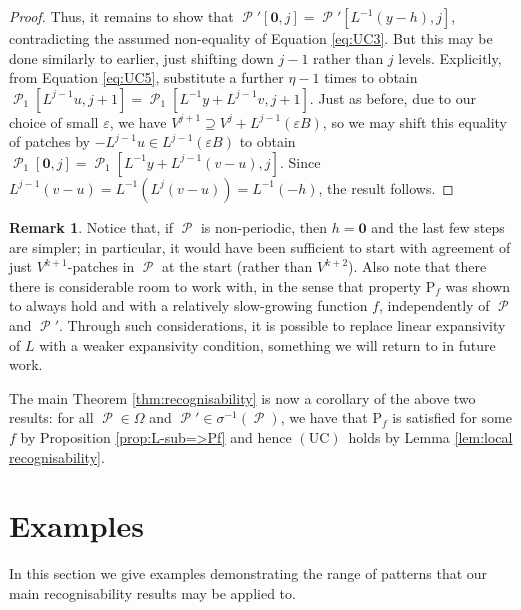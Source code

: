 \documentclass[11pt]{amsart}
\numberwithin{equation}{section}
\theoremstyle{plain}
\theoremstyle{definition}
\newtheorem{remark}[theorem]{Remark}
\renewcommand{\epsilon}{\varepsilon}
\newcommand{\sub}{\sigma}
\DeclareMathOperator{\cP}{\mathcal{P}}
\newcommand{\UC}{\(\mathrm{(UC)}\)}
\begin{document}
\begin{proof}
Thus, it remains to show that \(\cP'[\mathbf{0},j] = \cP'[L^{-1}(y-h),j]\), contradicting the assumed non-equality of Equation \ref{eq:UC3}. But this may be done similarly to earlier, just shifting down \(j-1\) rather than \(j\) levels. Explicitly, from Equation \ref{eq:UC5}, substitute a further \(\eta-1\) times to obtain \(\cP_1[L^{j-1} u,j+1] = \cP_1[L^{-1} y + L^{j-1} v,j+1]\). Just as before, due to our choice of small \(\epsilon\), we have \(V^{j+1} \supseteq V^j + L^{j-1}(\epsilon B)\), so we may shift this equality of patches by \(-L^{j-1} u \in L^{j-1}(\epsilon B)\) to obtain \(\cP_1[\mathbf{0},j] = \cP_1[L^{-1} y + L^{j-1}(v-u),j]\). Since \(L^{j-1}(v-u) = L^{-1}(L^j(v-u)) = L^{-1}(-h)\), the result follows.
\end{proof}

\begin{remark}
Notice that, if \(\cP\) is non-periodic, then \(h=\mathbf{0}\) and the last few steps are simpler; in particular, it would have been sufficient to start with agreement of just \(V^{k+1}\)-patches in \(\cP\) at the start (rather than \(V^{k+2}\)). Also note that there there is considerable room to work with, in the sense that property \(\mathrm{P}_f\) was shown to always hold and with a relatively slow-growing function \(f\), independently of \(\cP\) and \(\cP'\). Through such considerations, it is possible to replace linear expansivity of \(L\) with a weaker expansivity condition, something we will return to in future work.
\end{remark}

The main Theorem \ref{thm:recognisability} is now a corollary of the above two results: for all \(\cP \in \Omega\) and \(\cP' \in \sub^{-1}(\cP)\), we have that \(\mathrm{P}_f\) is satisfied for some \(f\) by Proposition \ref{prop:L-sub=>Pf} and hence \UC\ holds by Lemma \ref{lem:local recognisability}.


\section{Examples}\label{sec:examples}

In this section we give examples demonstrating the range of patterns that our main recognisability results may be applied to.
\end{document}
